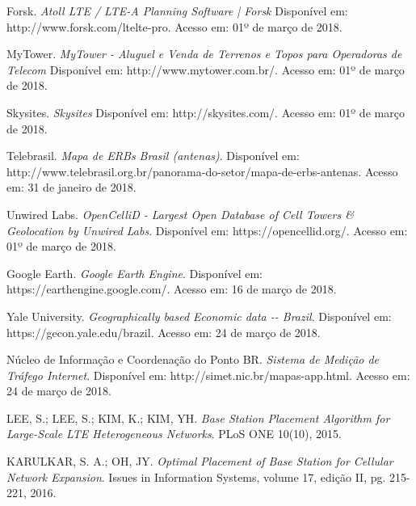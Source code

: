 \documentclass[]{politex}
\begin{document}
%

%

\begin{thebibliography}{9}
    
    Forsk.
    \textit{Atoll LTE / LTE-A Planning Software | Forsk}
    Disponível em: http://www.forsk.com/ltelte-pro.
    Acesso em: 01º de março de 2018.

    MyTower.
    \textit{MyTower - Aluguel e Venda de Terrenos e Topos para
    Operadoras de Telecom}
    Disponível em: http://www.mytower.com.br/.
    Acesso em: 01º de março de 2018.

    Skysites.
    \textit{Skysites}
    Disponível em: http://skysites.com/.
    Acesso em: 01º de março de 2018.

    Telebrasil.
    \textit{Mapa de ERBs Brasil (antenas)}.
    Disponível em:
    http://www.telebrasil.org.br/panorama-do-setor/mapa-de-erbs-antenas.
    Acesso em: 31 de janeiro de 2018.

    Unwired Labs.
    \textit{OpenCelliD - Largest Open Database of Cell Towers \&
    Geolocation by Unwired Labs}.
    Disponível em: https://opencellid.org/.
    Acesso em: 01º de março de 2018.

    Google Earth.
    \textit{Google Earth Engine}.
    Disponível em: https://earthengine.google.com/.
    Acesso em: 16 de março de 2018.

    Yale University.
    \textit{Geographically based Economic data -{}- Brazil}.
    Disponível em: https://gecon.yale.edu/brazil.
    Acesso em: 24 de março de 2018.

    Núcleo de Informação e Coordenação do Ponto BR.
    \textit{Sistema de Medição de Tráfego Internet}.
    Disponível em: http://simet.nic.br/mapas-app.html.
    Acesso em: 24 de março de 2018.

    LEE, S.; LEE, S.; KIM, K.; KIM, YH.
    \textit{Base Station Placement Algorithm for Large-Scale LTE
    Heterogeneous Networks}.
    PLoS ONE 10(10), 2015.

    KARULKAR, S. A.; OH, JY.
    \textit{Optimal Placement of Base Station for Cellular Network Expansion}.
    Issues in Information Systems, volume 17, edição II, pg. 215-221, 2016.

\end{thebibliography}
\apendice


\anexo
\end{document}
